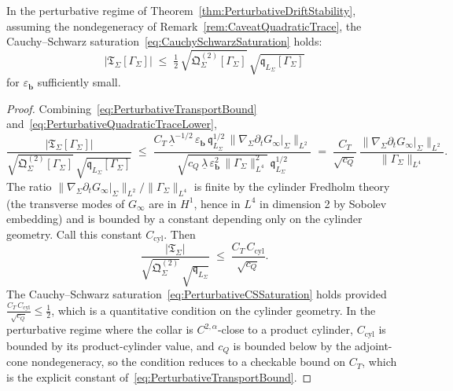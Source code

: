 \begin{theorem}\label{thm:PerturbativeCSSaturation}
In the perturbative regime of Theorem~\ref{thm:PerturbativeDriftStability}, assuming the nondegeneracy of Remark~\ref{rem:CaveatQuadraticTrace}, the Cauchy--Schwarz saturation~\eqref{eq:CauchySchwarzSaturation} holds:
\begin{equation}\label{eq:PerturbativeCSSaturation}
    |\mathfrak T_\Sigma[\Gamma_\Sigma]|
    \;\le\;
    \tfrac12\,\sqrt{\mathfrak Q_\Sigma^{(2)}[\Gamma_\Sigma]}\,\sqrt{\mathfrak q_{L_\Sigma}[\Gamma_\Sigma]}
\end{equation}
for $\varepsilon_{\mathbf b}$ sufficiently small.
\end{theorem}

\begin{proof}
Combining~\eqref{eq:PerturbativeTransportBound} and~\eqref{eq:PerturbativeQuadraticTraceLower},
\[
    \frac{|\mathfrak T_\Sigma[\Gamma_\Sigma]|}{\sqrt{\mathfrak Q_\Sigma^{(2)}[\Gamma_\Sigma]}\,\sqrt{\mathfrak q_{L_\Sigma}[\Gamma_\Sigma]}}
    \;\le\;
    \frac{C_T\,\underline\lambda^{-1/2}\,\varepsilon_{\mathbf b}\,\mathfrak q_{L_\Sigma}^{1/2}\,\|\nabla_\Sigma\partial_t G_\infty|_\Sigma\|_{L^2}}
         {\sqrt{c_Q\,\underline\lambda\,\varepsilon_{\mathbf b}^2\,\|\Gamma_\Sigma\|_{L^4}^2}\,\mathfrak q_{L_\Sigma}^{1/2}}
    \;=\;
    \frac{C_T}{\sqrt{c_Q}}\,\frac{\|\nabla_\Sigma\partial_t G_\infty|_\Sigma\|_{L^2}}{\|\Gamma_\Sigma\|_{L^4}} .
\]
The ratio $\|\nabla_\Sigma\partial_t G_\infty|_\Sigma\|_{L^2}/\|\Gamma_\Sigma\|_{L^4}$ is finite by the cylinder Fredholm theory (the transverse modes of $G_\infty$ are in $H^1$, hence in $L^4$ in dimension 2 by Sobolev embedding) and is bounded by a constant depending only on the cylinder geometry. Call this constant $C_{\mathrm{cyl}}$. Then
\[
    \frac{|\mathfrak T_\Sigma|}{\sqrt{\mathfrak Q_\Sigma^{(2)}}\,\sqrt{\mathfrak q_{L_\Sigma}}}
    \;\le\;\frac{C_T\,C_{\mathrm{cyl}}}{\sqrt{c_Q}} .
\]
The Cauchy--Schwarz saturation~\eqref{eq:PerturbativeCSSaturation} holds provided $\frac{C_T\,C_{\mathrm{cyl}}}{\sqrt{c_Q}}\le\tfrac12$, which is a quantitative condition on the cylinder geometry. In the perturbative regime where the collar is $C^{2,\alpha}$-close to a product cylinder, $C_{\mathrm{cyl}}$ is bounded by its product-cylinder value, and $c_Q$ is bounded below by the adjoint-cone nondegeneracy, so the condition reduces to a checkable bound on $C_T$, which is the explicit constant of~\eqref{eq:PerturbativeTransportBound}.
\end{proof}

